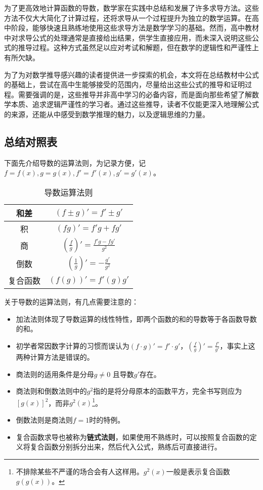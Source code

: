 
\begin{issues}
\issueDraft
\end{issues}


为了更高效地计算函数的导数，数学家在实践中总结和发展了许多求导方法。这些方法不仅大大简化了计算过程，还将求导从一个过程提升为独立的数学运算。在高中阶段，能够快速且熟练地使用这些求导方法是数学学习的基础。然而，高中教材中对求导公式的处理通常是直接给出结果，供学生直接应用，而未深入说明这些公式的推导过程。这种方式虽然足以应对考试和解题，但在数学的逻辑性和严谨性上有所欠缺。

为了为对数学推导感兴趣的读者提供进一步探索的机会，本文将在总结教材中公式的基础上，尝试在高中生能够接受的范围内，尽量给出这些公式的推导和证明过程。需要强调的是，这些推导并非高中学习的必备内容，而是面向那些希望了解数学本质、追求逻辑严谨性的学习者。通过这些推导，读者不仅能更深入地理解公式的来源，还能从中感受到数学推理的魅力，以及逻辑思维的力量。

\subsection{总结对照表}

下面先介绍导数的运算法则，为记录方便，记$f=f(x),g=g(x),f'=f'(x),g'=g'(x)$。
\begin{table}[ht]
\centering
\caption{导数运算法则}\label{tab_HsDerB1}
\begin{tabular}{|c|c|}
\hline
和差 & $(f\pm g)'=f'\pm g'$ \\
\hline
积 & $(fg)'=f'g+fg'$ \\
\hline
商 & $\displaystyle\left(\frac{f}{g}\right)'=\frac{f'g-fg'}{g^2}$ \\
\hline
倒数 & $\displaystyle\left(\frac{1}{g}\right)'=-\frac{g'}{g^2}$ \\
\hline
复合函数 & $(f(g))'=f'(g)g'$ \\
\hline
\end{tabular}
\end{table}

关于导数的运算法则，有几点需要注意的：
\begin{itemize}
\item 加法法则体现了导数运算的线性特性，即两个函数的和的导数等于各函数导数的和。
\item 初学者常因数字计算的习惯而误认为$(f \cdot g)'= f'\cdot g'$，$\displaystyle\left(\frac{f}{g}\right)'=\frac{f'}{g'}$，事实上这两种计算方法是错误的。
\item 商法则的适用条件是分母$g\neq0$ 且导数$g'$存在。
\item 商法则和倒数法则中的$g^2$指的是将分母原本的函数平方，完全书写则应为$[g(x)]^2$，而非$g^2(x)$\footnote{不排除某些不严谨的场合会有人这样用。$g^2(x)$一般是表示复合函数$g\left(g(x)\right)$。}。
\item 倒数法则是商法则$f=1$时的特例。
\item 复合函数求导也被称为\textbf{链式法则}，如果使用不熟练时，可以按照复合函数的定义将复合函数分别拆分出来，然后代入公式，熟练后可直接进行。
\end{itemize}


